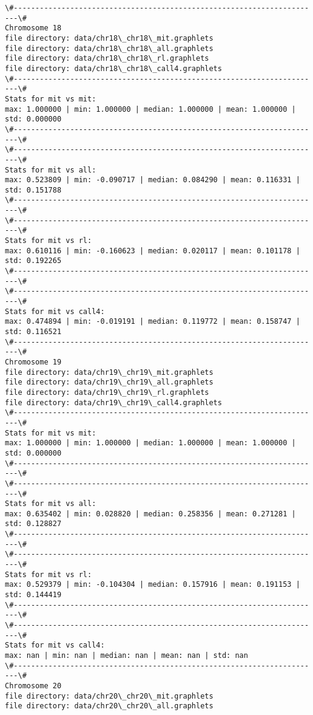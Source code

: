 \documentclass[11pt]{article}
\begin{document}
\begin{Verbatim}[commandchars=\\\{\}]
\#-----------------------------------------------------------------------\#
Chromosome 18
file directory: data/chr18\_chr18\_mit.graphlets
file directory: data/chr18\_chr18\_all.graphlets
file directory: data/chr18\_chr18\_rl.graphlets
file directory: data/chr18\_chr18\_call4.graphlets
\#-----------------------------------------------------------------------\#
Stats for mit vs mit: 
max: 1.000000 | min: 1.000000 | median: 1.000000 | mean: 1.000000 | std: 0.000000
\#-----------------------------------------------------------------------\#
\#-----------------------------------------------------------------------\#
Stats for mit vs all: 
max: 0.523809 | min: -0.090717 | median: 0.084290 | mean: 0.116331 | std: 0.151788
\#-----------------------------------------------------------------------\#
\#-----------------------------------------------------------------------\#
Stats for mit vs rl: 
max: 0.610116 | min: -0.160623 | median: 0.020117 | mean: 0.101178 | std: 0.192265
\#-----------------------------------------------------------------------\#
\#-----------------------------------------------------------------------\#
Stats for mit vs call4: 
max: 0.474894 | min: -0.019191 | median: 0.119772 | mean: 0.158747 | std: 0.116521
\#-----------------------------------------------------------------------\#
Chromosome 19
file directory: data/chr19\_chr19\_mit.graphlets
file directory: data/chr19\_chr19\_all.graphlets
file directory: data/chr19\_chr19\_rl.graphlets
file directory: data/chr19\_chr19\_call4.graphlets
\#-----------------------------------------------------------------------\#
Stats for mit vs mit: 
max: 1.000000 | min: 1.000000 | median: 1.000000 | mean: 1.000000 | std: 0.000000
\#-----------------------------------------------------------------------\#
\#-----------------------------------------------------------------------\#
Stats for mit vs all: 
max: 0.635402 | min: 0.028820 | median: 0.258356 | mean: 0.271281 | std: 0.128827
\#-----------------------------------------------------------------------\#
\#-----------------------------------------------------------------------\#
Stats for mit vs rl: 
max: 0.529379 | min: -0.104304 | median: 0.157916 | mean: 0.191153 | std: 0.144419
\#-----------------------------------------------------------------------\#
\#-----------------------------------------------------------------------\#
Stats for mit vs call4: 
max: nan | min: nan | median: nan | mean: nan | std: nan
\#-----------------------------------------------------------------------\#
Chromosome 20
file directory: data/chr20\_chr20\_mit.graphlets
file directory: data/chr20\_chr20\_all.graphlets

\end{Verbatim}
\end{document}
